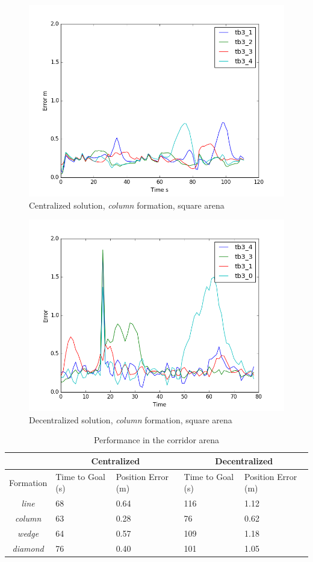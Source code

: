\documentclass[letterpaper, 10 pt, conference]{ieeeconf}  %
\begin{document}
\begin{figure}[tb]
\centering
\includegraphics[height=0.6\linewidth]{images/centralized_plot.png}
\caption{Centralized solution, \textit{column} formation, square arena}
\label{fig:centralized}
\end{figure}
\begin{figure}[tb]
\centering
\includegraphics[height=0.6\linewidth]{images/decentalized_plot.png}
\caption{Decentralized solution, \textit{column} formation, square arena}
\label{fig:decentralized}
\end{figure}

\begin{table}[tb]
\caption{Performance in the corridor arena}
\label{tab:results_corridor}
\begin{tabular}{|c|p{1cm}p{1.2cm}|p{1cm}p{1.2cm}|}
\hline
 & \multicolumn{2}{|c|}{Centralized} & \multicolumn{2}{|c|}{Decentralized} \\
\hline
Formation & Time to Goal (s) & Position Error (m) & Time to Goal (s) & Position Error (m) \\
\hline
\textit{line}        & 68                     & 0.64               & 116                   & 1.12 \\
\textit{column}   & 63                     & 0.28               & 76                    & 0.62 \\
\textit{wedge}    & 64                     & 0.57               & 109                  & 1.18 \\
\textit{diamond} & 76                     & 0.40               & 101                   & 1.05 \\
\hline
\end{tabular}
\end{table}
\end{document}
